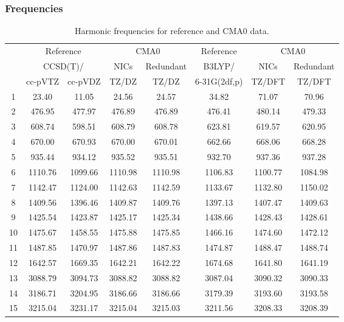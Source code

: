 \documentclass[10pt,oneside]{article}
\begin{document}
\begin{table}[h!]
\subsubsection*{Frequencies}
\centering
\caption{Harmonic frequencies for reference and CMA0 data.}
\begin{tabular}{cccccccc}
\toprule
{} & \multicolumn{2}{c}{Reference} & \multicolumn{2}{c}{CMA0} &    Reference & \multicolumn{2}{c}{CMA0} \\
{} & \multicolumn{2}{c}{CCSD(T)/} &    NICs &  Redundant &       B3LYP/ &    NICs & Redundant \\
{} &   cc-pVTZ & cc-pVDZ &   TZ/DZ &      TZ/DZ & 6-31G(2df,p) &  TZ/DFT &    TZ/DFT \\
\midrule
1  &     23.40 &   11.05 &   24.56 &      24.57 &        34.82 &   71.07 &     70.96 \\
2  &    476.95 &  477.97 &  476.89 &     476.89 &       476.41 &  480.14 &    479.33 \\
3  &    608.74 &  598.51 &  608.79 &     608.78 &       623.81 &  619.57 &    620.95 \\
4  &    670.00 &  670.93 &  670.00 &     670.01 &       662.66 &  668.06 &    668.28 \\
5  &    935.44 &  934.12 &  935.52 &     935.51 &       932.70 &  937.36 &    937.28 \\
6  &   1110.76 & 1099.66 & 1110.98 &    1110.98 &      1106.83 & 1100.77 &   1084.98 \\
7  &   1142.47 & 1124.00 & 1142.63 &    1142.59 &      1133.67 & 1132.80 &   1150.02 \\
8  &   1409.56 & 1396.46 & 1409.87 &    1409.76 &      1397.13 & 1407.47 &   1409.63 \\
9  &   1425.54 & 1423.87 & 1425.17 &    1425.34 &      1438.66 & 1428.43 &   1428.61 \\
10 &   1475.67 & 1458.55 & 1475.88 &    1475.85 &      1466.16 & 1474.60 &   1472.12 \\
11 &   1487.85 & 1470.97 & 1487.86 &    1487.83 &      1474.87 & 1488.47 &   1488.74 \\
12 &   1642.57 & 1669.35 & 1642.21 &    1642.22 &      1674.68 & 1641.80 &   1641.19 \\
13 &   3088.79 & 3094.73 & 3088.82 &    3088.82 &      3087.04 & 3090.32 &   3090.33 \\
14 &   3186.71 & 3204.95 & 3186.66 &    3186.66 &      3179.39 & 3193.60 &   3193.58 \\
15 &   3215.04 & 3231.17 & 3215.04 &    3215.03 &      3211.56 & 3208.33 &   3208.39 \\
\bottomrule
\end{tabular}
\end{table}
\end{document}
